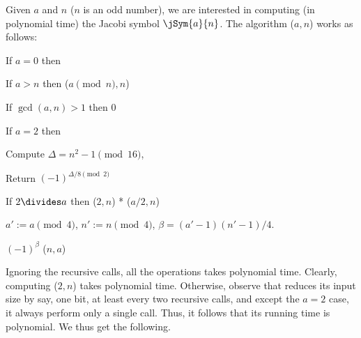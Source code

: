 Given $a$ and $n$ ($n$ is an odd number), we are interested in
computing (in polynomial time) the Jacobi symbol $\jSym{a}{n}$.  The
algorithm \algJacobi{}($a,n$) works as follows:
\begin{compactenumA}
    \item If $a=0$ then  

    \item If $a > n$ then \Return \algJacobi{}($a \pmod n ,n$)

    \item If $\gcd(a,n) > 1$ then \Return $0$ 

    \item If $a =2$ then
    \begin{compactenumI}
        \item Compute $\Delta = n^2 -1 \pmod{16}$,
        
        \item Return $(-1)^{\Delta/8 \pmod{2}}$ %
    \end{compactenumI}


    \item If $2 \divides a$ then \Return \algJacobi{}($2,n$) *
    \algJacobi{}($a/2,n$) 

    
    \item $a' := a \pmod{4}$, \qquad $n' := n \pmod{4}$, \qquad
    $\beta = (a' -1)(n'-1)/4$.

    \Return $(-1)^\beta$ \algJacobi{}($n,a$) %
\end{compactenumA}

\bigskip

Ignoring the recursive calls, all the operations takes polynomial
time. Clearly, computing \algJacobi{}($2,n$) takes polynomial time.
Otherwise, observe that \algJacobi reduces its input size by say, one
bit, at least every two recursive calls, and except the $a=2$ case, it
always perform only a single call. Thus, it follows that its running
time is polynomial. We thus get the following.

